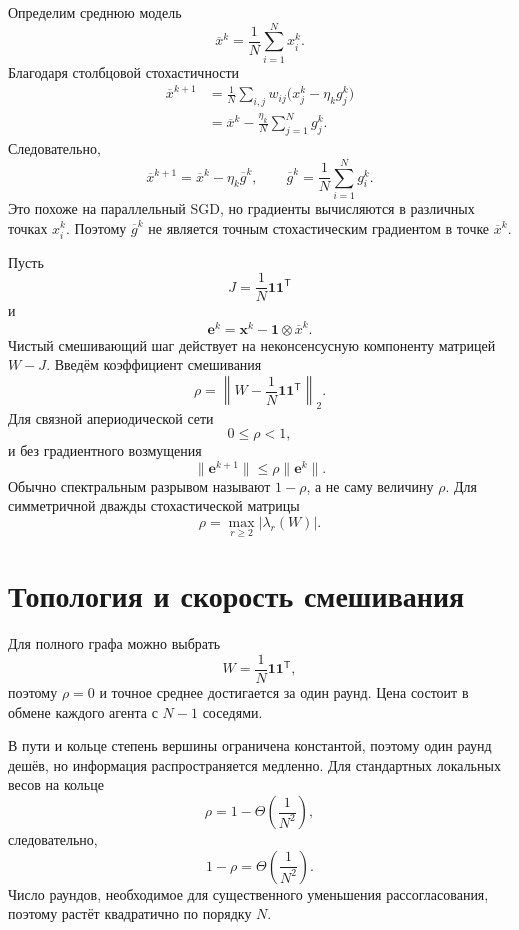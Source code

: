 Определим среднюю модель
\[
    \overline x^k
    =
    \frac1N
    \sum_{i=1}^{N}x_i^k.
\]
Благодаря столбцовой стохастичности
\[
\begin{aligned}
    \overline x^{k+1}
    &=
    \frac1N
    \sum_{i,j}
    w_{ij}
    \bigl(
        x_j^k-\eta_k g_j^k
    \bigr)
    \\
    &=
    \overline x^k
    -
    \frac{\eta_k}{N}
    \sum_{j=1}^{N}g_j^k.
\end{aligned}
\]
Следовательно,
\[
    \overline x^{k+1}
    =
    \overline x^k-\eta_k\overline g^k,
    \qquad
    \overline g^k
    =
    \frac1N
    \sum_{i=1}^{N}g_i^k.
\]
Это похоже на параллельный SGD, но градиенты вычисляются в различных
точках \(x_i^k\). Поэтому \(\overline g^k\) не является точным
стохастическим градиентом в точке \(\overline x^k\).

Пусть
\[
    J
    =
    \frac1N
    \mathbf1\mathbf1^{\mathsf T}
\]
и
\[
    \mathbf e^k
    =
    \mathbf x^k
    -
    \mathbf1\otimes\overline x^k.
\]
Чистый смешивающий шаг действует на неконсенсусную компоненту
матрицей \(W-J\). Введём коэффициент смешивания
\[
    \rho
    =
    \left\lVert
        W-
        \frac1N
        \mathbf1\mathbf1^{\mathsf T}
    \right\rVert_2.
\]
Для связной апериодической сети
\[
    0\le\rho<1,
\]
и без градиентного возмущения
\[
    \lVert\mathbf e^{k+1}\rVert
    \le
    \rho\lVert\mathbf e^k\rVert.
\]
Обычно спектральным разрывом называют \(1-\rho\), а не саму
величину \(\rho\). Для симметричной дважды стохастической матрицы
\[
    \rho
    =
    \max_{r\ge2}
    |\lambda_r(W)|.
\]

\section{Топология и скорость смешивания}

Для полного графа можно выбрать
\[
    W
    =
    \frac1N
    \mathbf1\mathbf1^{\mathsf T},
\]
поэтому \(\rho=0\) и точное среднее достигается за один раунд. Цена
состоит в обмене каждого агента с \(N-1\) соседями.

В пути и кольце степень вершины ограничена константой, поэтому один
раунд дешёв, но информация распространяется медленно. Для стандартных
локальных весов на кольце
\[
    \rho
    =
    1-
    \Theta\!\left(
        \frac1{N^2}
    \right),
\]
следовательно,
\[
    1-\rho
    =
    \Theta\!\left(
        \frac1{N^2}
    \right).
\]
Число раундов, необходимое для существенного уменьшения
рассогласования, поэтому растёт квадратично по порядку \(N\).

